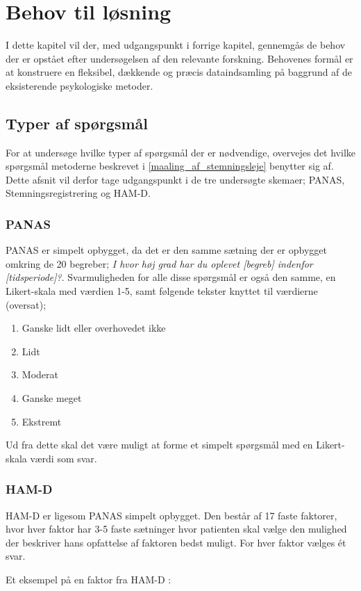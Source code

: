 \chapter{Behov til løsning}\label{krav}
I dette kapitel vil der, med udgangspunkt i forrige kapitel, gennemgås de behov der er opstået efter undersøgelsen af den relevante forskning.
Behovenes formål er at konstruere en fleksibel, dækkende og præcis dataindsamling på baggrund af de eksisterende psykologiske metoder.

\section{Typer af spørgsmål}
For at undersøge hvilke typer af spørgsmål der er nødvendige, overvejes det hvilke spørgsmål metoderne beskrevet i \cref{maaling_af_stemningsleje} benytter sig af.
Dette afsnit vil derfor tage udgangspunkt i de tre undersøgte skemaer; PANAS, Stemningsregistrering og HAM-D.

\subsection{PANAS} 
PANAS er simpelt opbygget, da det er den samme sætning der er opbygget omkring de 20 begreber; \textit{I hvor høj grad har du oplevet [begreb] indenfor [tidsperiode]?}.
Svarmuligheden for alle disse spørgsmål er også den samme, en Likert-skala\cite{likert} med værdien 1-5, samt følgende tekster knyttet til værdierne (oversat);
\begin{enumerate}
\item Ganske lidt eller overhovedet ikke
\item Lidt
\item Moderat
\item Ganske meget
\item Ekstremt
\end{enumerate}

Ud fra dette skal det være muligt at forme et simpelt spørgsmål med en Likert-skala værdi som svar.

\subsection{HAM-D} 
HAM-D er ligesom PANAS simpelt opbygget.
Den består af 17 faste faktorer, hvor hver faktor har 3-5 faste sætninger hvor patienten skal vælge den mulighed der beskriver hans opfattelse af faktoren bedst muligt.
For hver faktor vælges ét svar.

Et eksempel på en faktor fra HAM-D \cite{ham_d}:\\


